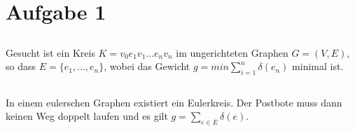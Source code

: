 \documentclass[a4paper]{article}
\begin{document}
\section{Aufgabe 1}

\subsection{}
Gesucht ist ein Kreis $K = v_0 e_1 v_1 ... e_n v_n$ im ungerichteten Graphen $G
= (V, E)$, so dass $E = \{ e_1, ..., e_n \}$, wobei das Gewicht
$g = min \sum\limits_{i=1}^{n} \delta(e_n)$ minimal ist.

\subsection{}
In einem eulerschen Graphen existiert ein Eulerkreis. Der Postbote muss dann
keinen Weg doppelt laufen und es gilt $g = \sum\limits_{e \in E} \delta(e)$.

\subsection{}
\begin{enumerate}
\end{enumerate}
\end{document}

